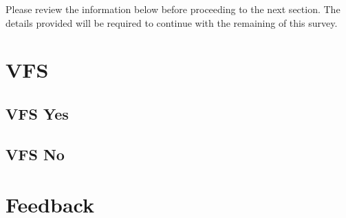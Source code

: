 \documentclass[a4paper,12pt,doube]{scrartcl}
\begin{document}
		
	
	Please review the information below before proceeding to the next section. The details provided will be required to continue with the remaining of this survey.
	
	\section{VFS}
	
		
		
		
	
	\subsection{VFS Yes}
	
		
	
	\subsection{VFS No}
	
		
		
	
	\section{Feedback}
	
		
	
\end{document}
